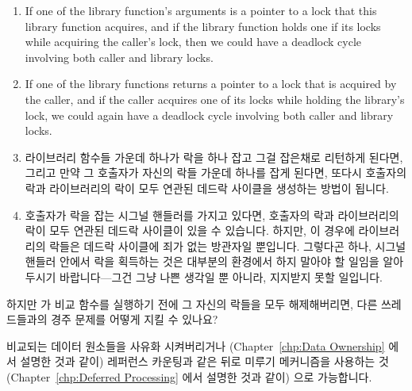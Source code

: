 \begin{enumerate}
\begin{enumerate}
	\item	If one of the library function's arguments is a pointer
		to a lock that this library function acquires, and if
		the library function holds one if its locks while
		acquiring the caller's lock, then we could have a
		deadlock cycle involving both caller and library locks.
	\item	If one of the library functions returns a pointer to
		a lock that is acquired by the caller, and if the
		caller acquires one of its locks while holding the
		library's lock, we could again have a deadlock
		cycle involving both caller and library locks.
	\fi
	\item	라이브러리 함수들 가운데 하나가 락을 하나 잡고 그걸 잡은채로
		리턴하게 된다면, 그리고 만약 그 호출자가 자신의 락들 가운데
		하나를 잡게 된다면, 또다시 호출자의 락과 라이브러리의 락이 모두
		연관된 데드락 사이클을 생성하는 방법이 됩니다.
	\item	호출자가 락을 잡는 시그널 핸들러를 가지고 있다면, 호출자의 락과
		라이브러리의 락이 모두 연관된 데드락 사이클이 있을 수 있습니다.
		하지만, 이 경우에 라이브러리의 락들은 데드락 사이클에 죄가 없는
		방관자일 뿐입니다.
		그렇다곤 하나, 시그널 핸들러 안에서 락을 획득하는 것은 대부분의
		환경에서 하지 말아야 할 일임을 알아두시기 바랍니다---그건 그냥
		나쁜 생각일 뿐 아니라, 지지받지 못할 일입니다.

	\end{enumerate}

\QuickQ{}
	하지만  가 비교 함수를 실행하기 전에 그 자신의 락들을 모두
	해제해버리면, 다른  쓰레드들과의 경주 문제를 어떻게 지킬 수
	있나요?

\QuickA{}
	비교되는 데이터 원소들을 사유화 시켜버리거나 (Chapter~\ref{chp:Data
	Ownership} 에서 설명한 것과 같이) 레퍼런스 카운팅과 같은 뒤로 미루기
	메커니즘을 사용하는 것 (Chapter~\ref{chp:Deferred Processing} 에서
	설명한 것과 같이) 으로 가능합니다.
	\iffalse


\end{enumerate}
